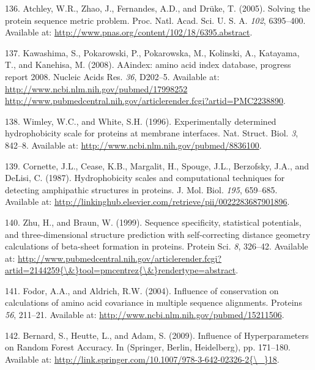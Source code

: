 \documentclass[12pt,a4paper,twoside]{book}
\theoremstyle{definition}
\theoremstyle{definition}
\theoremstyle{remark}
\begin{document}
\hypertarget{ref-Atchley2005}{}
136. Atchley, W.R., Zhao, J., Fernandes, A.D., and Drüke, T. (2005).
Solving the protein sequence metric problem. Proc. Natl. Acad. Sci. U.
S. A. \emph{102}, 6395--400. Available at:
\url{http://www.pnas.org/content/102/18/6395.abstract}.

\hypertarget{ref-Kawashima2008}{}
137. Kawashima, S., Pokarowski, P., Pokarowska, M., Kolinski, A.,
Katayama, T., and Kanehisa, M. (2008). AAindex: amino acid index
database, progress report 2008. Nucleic Acids Res. \emph{36}, D202--5.
Available at:
\href{http://www.ncbi.nlm.nih.gov/pubmed/17998252\%20http://www.pubmedcentral.nih.gov/articlerender.fcgi?artid=PMC2238890}{http://www.ncbi.nlm.nih.gov/pubmed/17998252 http://www.pubmedcentral.nih.gov/articlerender.fcgi?artid=PMC2238890}.

\hypertarget{ref-Wimley1996}{}
138. Wimley, W.C., and White, S.H. (1996). Experimentally determined
hydrophobicity scale for proteins at membrane interfaces. Nat. Struct.
Biol. \emph{3}, 842--8. Available at:
\url{http://www.ncbi.nlm.nih.gov/pubmed/8836100}.

\hypertarget{ref-Cornette1987}{}
139. Cornette, J.L., Cease, K.B., Margalit, H., Spouge, J.L., Berzofsky,
J.A., and DeLisi, C. (1987). Hydrophobicity scales and computational
techniques for detecting amphipathic structures in proteins. J. Mol.
Biol. \emph{195}, 659--685. Available at:
\url{http://linkinghub.elsevier.com/retrieve/pii/0022283687901896}.

\hypertarget{ref-Zhu1999}{}
140. Zhu, H., and Braun, W. (1999). Sequence specificity, statistical
potentials, and three-dimensional structure prediction with
self-correcting distance geometry calculations of beta-sheet formation
in proteins. Protein Sci. \emph{8}, 326--42. Available at:
\href{http://www.pubmedcentral.nih.gov/articlerender.fcgi?artid=2144259\%7B/\&\%7Dtool=pmcentrez\%7B/\&\%7Drendertype=abstract}{http://www.pubmedcentral.nih.gov/articlerender.fcgi?artid=2144259\{\textbackslash{}\&\}tool=pmcentrez\{\textbackslash{}\&\}rendertype=abstract}.

\hypertarget{ref-Fodor2004a}{}
141. Fodor, A.A., and Aldrich, R.W. (2004). Influence of conservation on
calculations of amino acid covariance in multiple sequence alignments.
Proteins \emph{56}, 211--21. Available at:
\url{http://www.ncbi.nlm.nih.gov/pubmed/15211506}.

\hypertarget{ref-Bernard2009}{}
142. Bernard, S., Heutte, L., and Adam, S. (2009). Influence of
Hyperparameters on Random Forest Accuracy. In (Springer, Berlin,
Heidelberg), pp. 171--180. Available at:
\href{http://link.springer.com/10.1007/978-3-642-02326-2\%7B/_\%7D18}{http://link.springer.com/10.1007/978-3-642-02326-2\{\textbackslash{}\_\}18}.
\end{document}

